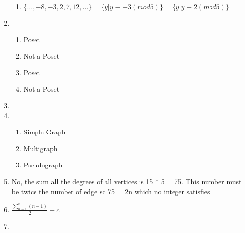 \documentclass[11pt]{article}
\begin{document}
\begin{enumerate}
\begin{enumerate}
        \item $ \{\dots, -8, -3, 2, 7, 12, \dots\} = \{y|y\equiv -3(mod 5)\} = \{y|y\equiv 2(mod 5)\}$
    \end{enumerate}
    \item \begin{enumerate}
        \item Poset
        \item Not a Poset
        \item Poset
        \item Not a Poset
    \end{enumerate}
    \item {}
    \item \begin{enumerate}
        \item Simple Graph
        \item Multigraph
        \item Pseudograph
    \end{enumerate}
    \item No, the sum all the degrees of all vertices is 15 * 5 = 75. This number
    must be twice  the number of edge so 75 = 2n which no integer satisfies
    \item $\frac{\sum_{n = 1}^{v}(n-1)}{2} - c  $
    \item {}
\end{enumerate}
\end{document}
